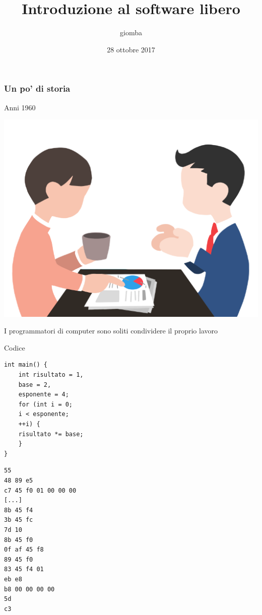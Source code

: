 \documentclass{beamer}
\title{Introduzione al software libero}
\author{giomba}
\date{28 ottobre 2017}
\institute{GOLEM Empoli}
\begin{document}
\begin{frame}
  \maketitle
  \tableofcontents
\end{frame}

\begin{frame}[fragile]
\frametitle{Un po' di storia}

    \begin{block}{Anni 1960}
	\begin{minipage}{.15\linewidth}
	    \includegraphics[width=.9\linewidth]{img/meeting.png}
	\end{minipage}
    \begin{minipage}{.8\linewidth}
    I programmatori di computer sono soliti condividere il proprio lavoro
    \begin{exampleblock}{Codice}
    \begin{minipage}{.45\linewidth}
        \begin{Verbatim}[fontsize=\scriptsize]
int main() {
    int risultato = 1,
    base = 2,
    esponente = 4;
    for (int i = 0;
    i < esponente;
    ++i) {
    risultato *= base;
    }
}
        \end{Verbatim}
    \end{minipage}
    \begin{minipage}{.45\linewidth}
        \begin{Verbatim}[fontsize=\scriptsize]
55
48 89 e5
c7 45 f0 01 00 00 00
[...]
8b 45 f4
3b 45 fc
7d 10
8b 45 f0
0f af 45 f8
89 45 f0
83 45 f4 01
eb e8
b8 00 00 00 00
5d
c3
        \end{Verbatim}
    \end{minipage}
    \end{exampleblock}
    \end{minipage}
    \end{block}
\end{frame}
\end{document}
